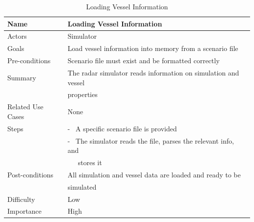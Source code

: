 \documentclass[12pt]{article}
\begin{document}
\begin{table}[ht]
\centering
   \begin{tabular}{|l|l|}
        \hline
        {\large Name} & {\large Loading Vessel Information} \\
        \hline\hline
        Actors & Simulator\\
        \hline
        Goals & Load vessel information into memory from a scenario file\\
        \hline
        Pre-conditions & Scenario file must exist and be formatted correctly\\
        \hline
        Summary & The radar simulator reads information on simulation and vessel\\ 
         & properties\\
        \hline
        Related Use Cases & None\\
        \hline
        Steps & - \ A specific scenario file is provided\\
         & - \ The simulator reads the file, parses the relevant info, and\\ 
         & \ \ \ stores it\\
        \hline
        Post-conditions & All simulation and vessel data are loaded and ready to be\\ 
         & simulated\\
        \hline
        Difficulty & Low\\
        \hline
        Importance & High\\
        \hline
    \end{tabular}
\caption{Loading Vessel Information}
\end{table}
\end{document}
